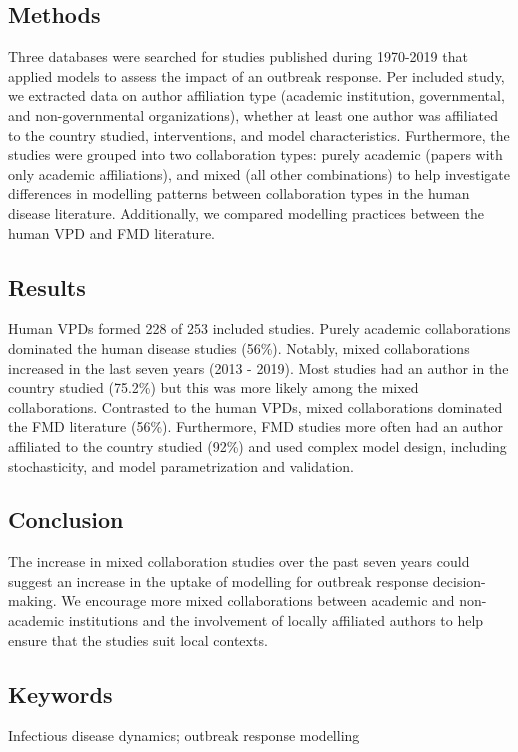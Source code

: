 \documentclass[10pt,letterpaper]{article}
\begin{document}
\subsection*{Methods}
Three databases were searched for studies published during 1970-2019 that applied models to assess the impact of an outbreak response. Per included study, we extracted data on author affiliation type (academic institution, governmental, and non-governmental organizations), whether at least one author was affiliated to the country studied, interventions, and model characteristics. Furthermore, the studies were grouped into two collaboration types: purely academic (papers with only academic affiliations), and mixed (all other combinations) to help investigate differences in modelling patterns between collaboration types in the human disease literature. Additionally, we compared modelling practices between the human VPD and FMD literature. 
\subsection*{Results}
Human VPDs formed 228 of 253 included studies. Purely academic collaborations dominated the human disease studies (56\%). Notably, mixed collaborations increased in the last seven years (2013 - 2019). Most studies had an author in the country studied (75.2\%) but this was more likely among the mixed collaborations. Contrasted to the human VPDs, mixed collaborations dominated the FMD literature (56\%). Furthermore, FMD studies more often had an author affiliated to the country studied (92\%) and used complex model design, including stochasticity, and model parametrization and validation. 
\subsection*{Conclusion}
The increase in mixed collaboration studies over the past seven years could suggest an increase in the uptake of modelling for outbreak response decision-making. We encourage more mixed collaborations between academic and non-academic institutions and the involvement of locally affiliated authors to help ensure that the studies suit local contexts.

\subsection*{Keywords}
Infectious disease dynamics; outbreak response modelling
\end{document}

